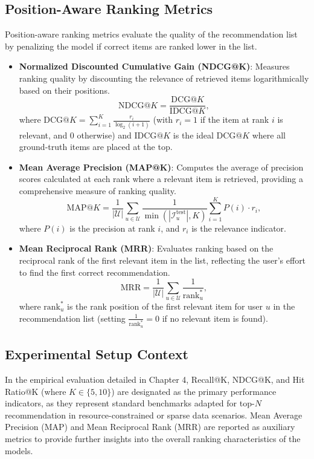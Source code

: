 \subsection{Position-Aware Ranking Metrics}

Position-aware ranking metrics evaluate the quality of the recommendation list by penalizing the model if correct items are ranked lower in the list.

\begin{itemize}
    \item \textbf{Normalized Discounted Cumulative Gain (NDCG@K)}: Measures ranking quality by discounting the relevance of retrieved items logarithmically based on their positions.
    \begin{equation}
        \text{NDCG}@K = \frac{\text{DCG}@K}{\text{IDCG}@K},
    \end{equation}
    where \(\text{DCG}@K = \sum_{i=1}^{K} \frac{r_i}{\log_2(i+1)}\) (with \(r_i = 1\) if the item at rank \(i\) is relevant, and \(0\) otherwise) and \(\text{IDCG}@K\) is the ideal \(\text{DCG}@K\) where all ground-truth items are placed at the top.
    
    \item \textbf{Mean Average Precision (MAP@K)}: Computes the average of precision scores calculated at each rank where a relevant item is retrieved, providing a comprehensive measure of ranking quality.
    \begin{equation}
        \text{MAP}@K = \frac{1}{|\mathcal{U}|} \sum_{u \in \mathcal{U}} \frac{1}{\min(|\mathcal{I}_u^{\text{test}}|, K)} \sum_{i=1}^{K} P(i) \cdot r_i,
    \end{equation}
    where \(P(i)\) is the precision at rank \(i\), and \(r_i\) is the relevance indicator.
    
    \item \textbf{Mean Reciprocal Rank (MRR)}: Evaluates ranking based on the reciprocal rank of the first relevant item in the list, reflecting the user's effort to find the first correct recommendation.
    \begin{equation}
        \text{MRR} = \frac{1}{|\mathcal{U}|} \sum_{u \in \mathcal{U}} \frac{1}{\text{rank}_u^*},
    \end{equation}
    where \(\text{rank}_u^*\) is the rank position of the first relevant item for user \(u\) in the recommendation list (setting \(\frac{1}{\text{rank}_u^*} = 0\) if no relevant item is found).
\end{itemize}


\subsection{Experimental Setup Context}

In the empirical evaluation detailed in Chapter 4, Recall@K, NDCG@K, and Hit Ratio@K (where \(K \in \{5, 10\}\)) are designated as the primary performance indicators, as they represent standard benchmarks adapted for top-\(N\) recommendation in resource-constrained or sparse data scenarios. Mean Average Precision (MAP) and Mean Reciprocal Rank (MRR) are reported as auxiliary metrics to provide further insights into the overall ranking characteristics of the models.
